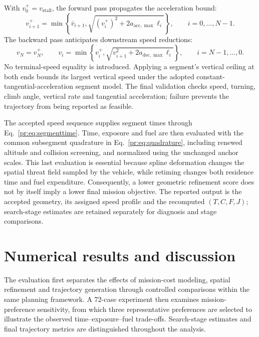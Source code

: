 \documentclass[preprint,12pt]{elsarticle}
\begin{document}
With $v_0^+=v_{\mathrm{stall}}$, the forward pass propagates the acceleration
bound:
\begin{equation}
 v_{i+1}^+=\min\left\{\bar v_{i+1},
       \sqrt{(v_i^+)^2+2a_{\mathrm{acc},\max}\ell_i}\right\},
 \qquad i=0,\ldots,N-1.
 \label{me:eq:forward}
\end{equation}
The backward pass anticipates downstream speed reductions:
\begin{equation}
 v_N=v_N^+,\qquad
 v_i=\min\left\{v_i^+,
       \sqrt{v_{i+1}^2+2a_{\mathrm{dec},\max}\ell_i}\right\},
 \qquad i=N-1,\ldots,0.
 \label{me:eq:backward}
\end{equation}
No terminal-speed equality is introduced. Applying a segment's vertical
ceiling at both ends bounds its largest vertical speed under the adopted
constant-tangential-acceleration segment model. The final validation checks
speed, turning, climb angle, vertical rate and tangential acceleration;
failure prevents the trajectory from being reported as feasible.

The accepted speed sequence supplies segment times through
Eq.~\eqref{pr:eq:segmenttime}. Time, exposure and fuel are then evaluated
with the common subsegment quadrature in Eq.~\eqref{pr:eq:quadrature},
including renewed altitude and collision screening, and normalized using
the unchanged anchor scales. This last evaluation is essential because
spline deformation changes the spatial threat field sampled by the
vehicle, while retiming changes both residence time and fuel expenditure.
Consequently, a lower geometric refinement score does not by itself imply
a lower final mission objective. The reported output is the accepted
geometry, its assigned speed profile and the recomputed $(T,C,F,J)$;
search-stage estimates are retained separately for diagnosis and stage comparisons.



\section{Numerical results and discussion}
\label{sec:results}

The evaluation first separates the effects of mission-cost modeling,
spatial refinement and trajectory generation through controlled comparisons
within the same planning framework. A 72-case experiment then examines
mission-preference sensitivity, from which three representative preferences
are selected to illustrate the observed time--exposure--fuel trade-offs.
Search-stage estimates and final trajectory metrics are distinguished
throughout the analysis.
\end{document}
